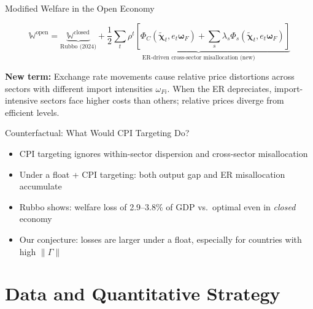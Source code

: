 \documentclass[aspectratio=169]{beamer}
\begin{document}
\begin{frame}{Modified Welfare in the Open Economy}

\begin{equation*}
    \mathbb{W}^{\text{open}} = \underbrace{\mathbb{W}^{\text{closed}}}_{\text{Rubbo (2024)}} + \underbrace{\frac{1}{2}\sum_t \rho^t \left[\Phi_C(\tilde{\bm{\chi}}_t, e_t\bm{\omega}_F) + \sum_s\lambda_s\Phi_s(\tilde{\bm{\chi}}_t, e_t\bm{\omega}_F)\right]}_{\text{ER-driven cross-sector misallocation (new)}}
\end{equation*}

\vspace{0.2cm}
\textbf{New term:} Exchange rate movements cause relative price distortions across sectors with different import intensities $\omega_{Fi}$. When the ER depreciates, import-intensive sectors face higher costs than others; relative prices diverge from efficient levels.

\vspace{0.2cm}
\begin{block}{Counterfactual: What Would CPI Targeting Do?}
\begin{itemize}
    \item CPI targeting ignores within-sector dispersion and cross-sector misallocation
    \item Under a float + CPI targeting: both output gap and ER misallocation accumulate
    \item Rubbo shows: welfare loss of 2.9--3.8\% of GDP vs.\ optimal even in \textit{closed} economy
    \item Our conjecture: losses are larger under a float, especially for countries with high $\|\Gamma\|$
\end{itemize}
\end{block}
\end{frame}

\section{Data and Quantitative Strategy}
\end{document}
